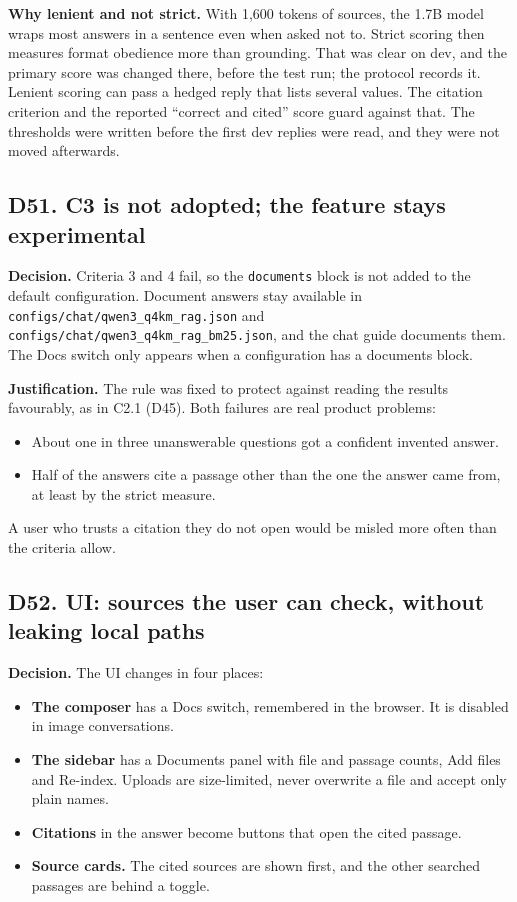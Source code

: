 \documentclass[11pt,a4paper]{article}
\newcommand{\code}[1]{\texttt{#1}}
\begin{document}
\textbf{Why lenient and not strict.} With 1,600 tokens of sources, the 1.7B model wraps most answers in a sentence even when asked not to. Strict scoring then measures format obedience more than grounding. That was clear on dev, and the primary score was changed there, before the test run; the protocol records it. Lenient scoring can pass a hedged reply that lists several values. The citation criterion and the reported ``correct and cited'' score guard against that. The thresholds were written before the first dev replies were read, and they were not moved afterwards.

\subsection{D51. C3 is not adopted; the feature stays experimental}

\textbf{Decision.} Criteria 3 and 4 fail, so the \code{documents} block is not added to the default configuration. Document answers stay available in \code{configs/chat/qwen3\_q4km\_rag.json} and \code{configs/chat/qwen3\_q4km\_rag\_bm25.json}, and the chat guide documents them. The Docs switch only appears when a configuration has a documents block.

\textbf{Justification.} The rule was fixed to protect against reading the results favourably, as in C2.1 (D45). Both failures are real product problems:

\begin{itemize}
\item About one in three unanswerable questions got a confident invented answer.
\item Half of the answers cite a passage other than the one the answer came from, at least by the strict measure.
\end{itemize}

A user who trusts a citation they do not open would be misled more often than the criteria allow.

\subsection{D52. UI: sources the user can check, without leaking local paths}

\textbf{Decision.} The UI changes in four places:

\begin{itemize}
\item \textbf{The composer} has a Docs switch, remembered in the browser. It is disabled in image conversations.
\item \textbf{The sidebar} has a Documents panel with file and passage counts, Add files and Re-index. Uploads are size-limited, never overwrite a file and accept only plain names.
\item \textbf{Citations} in the answer become buttons that open the cited passage.
\item \textbf{Source cards.} The cited sources are shown first, and the other searched passages are behind a toggle.
\end{itemize}
\end{document}
